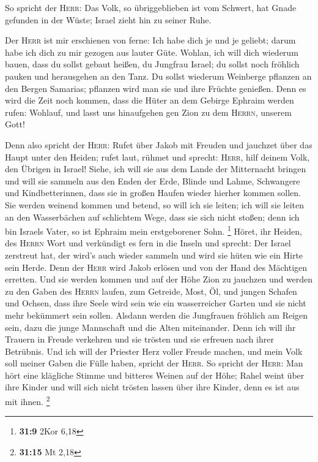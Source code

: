  So spricht der \textsc{Herr}: Das Volk, so übriggeblieben
ist vom Schwert, hat Gnade gefunden in der Wüste; Israel zieht hin zu
seiner Ruhe.

 Der \textsc{Herr} ist mir erschienen von ferne: Ich habe
dich je und je geliebt; darum habe ich dich zu mir gezogen aus lauter
Güte.  Wohlan, ich will dich wiederum bauen, dass du
sollst gebaut heißen, du Jungfrau Israel; du sollst noch fröhlich pauken
und herausgehen an den Tanz.  Du sollst wiederum Weinberge
pflanzen an den Bergen Samarias; pflanzen wird man sie und ihre Früchte
genießen.  Denn es wird die Zeit noch kommen, dass die
Hüter an dem Gebirge Ephraim werden rufen: Wohlauf, und lasst uns
hinaufgehen gen Zion zu dem \textsc{Herrn}, unserem Gott!

 Denn also spricht der \textsc{Herr}: Rufet über Jakob mit
Freuden und jauchzet über das Haupt unter den Heiden; rufet laut, rühmet
und sprecht: \textsc{Herr}, hilf deinem Volk, den Übrigen in Israel!
 Siehe, ich will sie aus dem Lande der Mitternacht bringen
und will sie sammeln aus den Enden der Erde, Blinde und Lahme,
Schwangere und Kindbetterinnen, dass sie in großen Haufen wieder hierher
kommen sollen.  Sie werden weinend kommen und betend, so
will ich sie leiten; ich will sie leiten an den Wasserbächen auf
schlichtem Wege, dass sie sich nicht stoßen; denn ich bin Israels Vater,
so ist Ephraim mein erstgeborener Sohn. \footnote{\textbf{31:9} 2Kor
  6,18}  Höret, ihr Heiden, des \textsc{Herrn} Wort und
verkündigt es fern in die Inseln und sprecht: Der Israel zerstreut hat,
der wird's auch wieder sammeln und wird sie hüten wie ein Hirte sein
Herde.  Denn der \textsc{Herr} wird Jakob erlösen und von
der Hand des Mächtigen erretten.  Und sie werden kommen
und auf der Höhe Zion zu jauchzen und werden zu den Gaben des
\textsc{Herrn} laufen, zum Getreide, Most, Öl, und jungen Schafen und
Ochsen, dass ihre Seele wird sein wie ein wasserreicher Garten und sie
nicht mehr bekümmert sein sollen.  Alsdann werden die
Jungfrauen fröhlich am Reigen sein, dazu die junge Mannschaft und die
Alten miteinander. Denn ich will ihr Trauern in Freude verkehren und sie
trösten und sie erfreuen nach ihrer Betrübnis.  Und ich
will der Priester Herz voller Freude machen, und mein Volk soll meiner
Gaben die Fülle haben, spricht der \textsc{Herr}.  So
spricht der \textsc{Herr}: Man hört eine klägliche Stimme und bitteres
Weinen auf der Höhe; Rahel weint über ihre Kinder und will sich nicht
trösten lassen über ihre Kinder, denn es ist aus mit ihnen. \footnote{\textbf{31:15}
  Mt 2,18}

